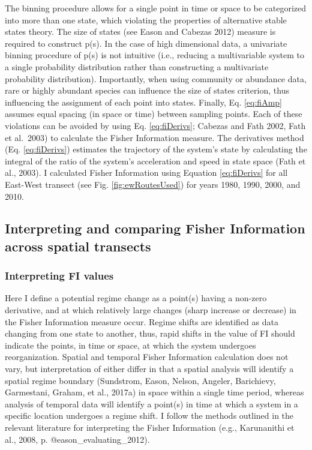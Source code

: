 \documentclass[12pt,twoside,openany]{reedthesis}
\begin{document}
The binning procedure allows for a single point in time or space to be categorized into more than one state, which violating the properties of alternative stable states theory. The size of states (see Eason and Cabezas 2012) measure is required to construct p(s). In the case of high dimensional data, a univariate binning procedure of p(s) is not intuitive (i.e., reducing a multivariable system to a single probability distribution rather than constructing a multivariate probability distribution). Importantly, when using community or abundance data, rare or highly abundant species can influence the size of states criterion, thus influencing the assignment of each point into states. Finally, Eq. \eqref{eq:fiAmp} assumes equal spacing (in space or time) between sampling points. Each of these violations can be avoided by using Eq. \eqref{eq:fiDerivs}; Cabezas and Fath 2002, Fath et al.~2003) to calculate the Fisher Information measure. The derivatives method (Eq. \eqref{eq:fiDerivs}) estimates the trajectory of the system's state by calculating the integral of the ratio of the system's acceleration and speed in state space (Fath et al., 2003). I calculated Fisher Information using Equation \eqref{eq:fiDerivs} for all East-West transect (see Fig. \ref{fig:ewRoutesUsed}) for years 1980, 1990, 2000, and 2010.

\hypertarget{interpreting-and-comparing-fisher-information-across-spatial-transects}{%
\subsection{Interpreting and comparing Fisher Information across spatial transects}\label{interpreting-and-comparing-fisher-information-across-spatial-transects}}

\hypertarget{interpreting-fi-values}{%
\subsubsection{Interpreting FI values}\label{interpreting-fi-values}}

Here I define a potential regime change as a point(s) having a non-zero derivative, and at which relatively large changes (sharp increase or decrease) in the Fisher Information measure occur. Regime shifts are identified as data changing from one state to another, thus, rapid shifts in the value of FI should indicate the points, in time or space, at which the system undergoes reorganization. Spatial and temporal Fisher Information calculation does not vary, but interpretation of either differ in that a spatial analysis will identify a spatial regime boundary (Sundstrom, Eason, Nelson, Angeler, Barichievy, Garmestani, Graham, et al., 2017a) in space within a single time period, whereas analysis of temporal data will identify a point(s) in time at which a system in a specific location undergoes a regime shift. I follow the methods outlined in the relevant literature for interpreting the Fisher Information (e.g., Karunanithi et al., 2008, p. @eason\_evaluating\_2012).
\end{document}
